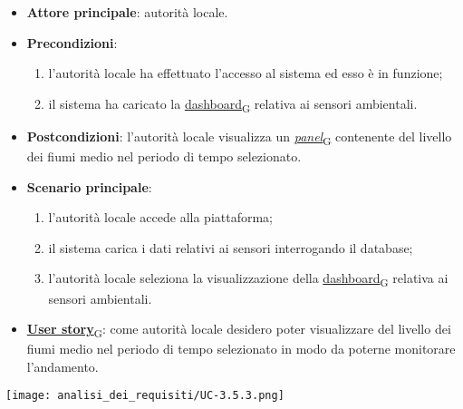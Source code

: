 \begin{itemize}
	\item \textbf{Attore principale}: autorità locale.
	\item \textbf{Precondizioni}:
	      \begin{enumerate}
		      \item l'autorità locale ha effettuato l'accesso al sistema ed esso è in funzione;
		      \item il sistema ha caricato la \href{https://7last.github.io/docs/pb/documentazione-interna/glossario\#dashboard}{dashboard\textsubscript{G}} relativa ai sensori ambientali.
	      \end{enumerate}
	\item \textbf{Postcondizioni}: l'autorità locale visualizza un \href{https://7last.github.io/docs/pb/documentazione-interna/glossario\#panel}{\textit{panel}\textsubscript{G}} contenente del livello dei fiumi medio nel periodo di tempo selezionato.
	\item \textbf{Scenario principale}:
	      \begin{enumerate}
		      \item l'autorità locale accede alla piattaforma;
		      \item il sistema carica i dati relativi ai sensori interrogando il database;
		      \item l'autorità locale seleziona la visualizzazione della \href{https://7last.github.io/docs/pb/documentazione-interna/glossario\#dashboard}{dashboard\textsubscript{G}} relativa ai sensori ambientali.
	      \end{enumerate}
	\item \href{https://7last.github.io/docs/pb/documentazione-interna/glossario\#user-story}{\textbf{User story}\textsubscript{G}}:
	      come autorità locale desidero poter visualizzare del livello dei fiumi medio nel periodo di tempo selezionato
	      in modo da poterne monitorare l'andamento.
\end{itemize}
\begin{center}
	\texttt{[image: analisi\_dei\_requisiti/UC-3.5.3.png]}
\end{center}


